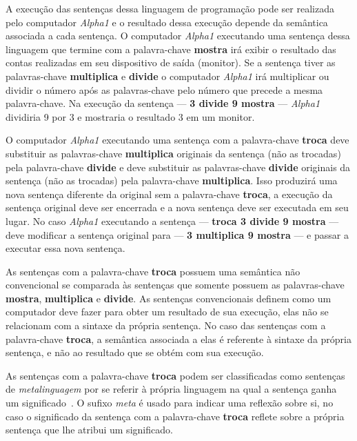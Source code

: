 A execução das sentenças dessa linguagem de programação pode ser realizada pelo computador \emph{Alpha1} e o resultado dessa execução depende da semântica associada a cada sentença. O computador \emph{Alpha1} executando uma sentença dessa linguagem que termine com a palavra-chave \textbf{mostra} irá exibir o resultado das contas realizadas em seu dispositivo de saída (monitor). Se a sentença tiver as palavras-chave \textbf{multiplica} e \textbf{divide} o computador \emph{Alpha1} irá multiplicar ou dividir o número após as palavras-chave pelo número que precede a mesma palavra-chave. Na execução da sentença --- \textbf{3 divide 9 mostra} --- \emph{Alpha1} dividiria 9 por 3 e mostraria o resultado 3 em um monitor.

O computador \emph{Alpha1} executando uma sentença com a palavra-chave \textbf{troca} deve substituir as palavras-chave \textbf{multiplica} originais da sentença (não as trocadas) pela palavra-chave \textbf{divide} e deve substituir as palavras-chave \textbf{divide} originais da sentença (não as trocadas) pela palavra-chave \textbf{multiplica}. Isso produzirá uma nova sentença diferente da original sem a palavra-chave \textbf{troca}, a execução da sentença original deve ser encerrada e a nova sentença deve ser executada em seu lugar.  No caso \emph{Alpha1} executando a sentença --- \textbf{troca 3 divide 9 mostra} --- deve modificar a sentença original para --- \textbf{3 multiplica 9 mostra} --- e passar a executar essa nova sentença.

As sentenças com a palavra-chave \textbf{troca} possuem uma semântica não convencional se comparada às sentenças que somente possuem as palavras-chave \textbf{mostra}, \textbf{multiplica} e \textbf{divide}. As sentenças convencionais definem como um computador deve fazer para obter um resultado de sua execução, elas não se relacionam com a sintaxe da própria sentença. No caso das sentenças com a palavra-chave \textbf{troca}, a semântica associada a elas é referente à sintaxe da própria sentença, e não ao resultado que se obtém com sua execução.

As sentenças com a palavra-chave \textbf{troca} podem ser classificadas como sentenças de \emph{metalinguagem} por se referir à própria linguagem na qual a sentença ganha um significado~\cite{damavsevivcius2015taxonomy}. O sufixo \emph{meta} é usado para indicar uma reflexão sobre si, no caso o significado da sentença com a palavra-chave \textbf{troca} reflete sobre a própria sentença que lhe atribui um significado.

